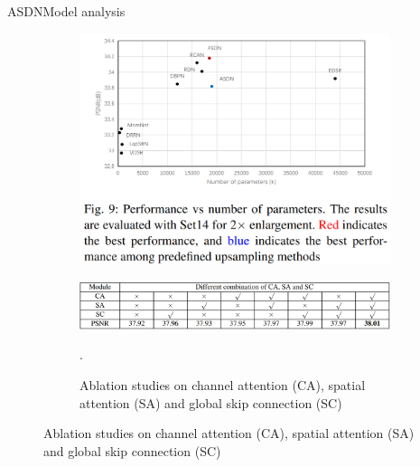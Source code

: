 \documentclass[
    xcolor={svgnames},
    hyperref={colorlinks,citecolor=OrangeRed,linkcolor=OrangeRed,urlcolor=DarkBlue}
    ]{beamer}
\begin{document}
\begin{frame}{ASDN}{Model analysis}
    \begin{figure}
        \begin{subfigure}{\textwidth}
            \centering
            \includegraphics[height=0.5\textheight,keepaspectratio]{asdn-psnr-n_params.png}                
        \end{subfigure}
        \begin{subfigure}{\textwidth}
            \centering
            \includegraphics[scale=0.2]{asdn-ablation-study.png}
            \caption{Ablation studies on channel attention (CA), spatial attention (SA) and global skip connection (SC)}.
        \end{subfigure}
    \end{figure}
\end{frame}
\end{document}
